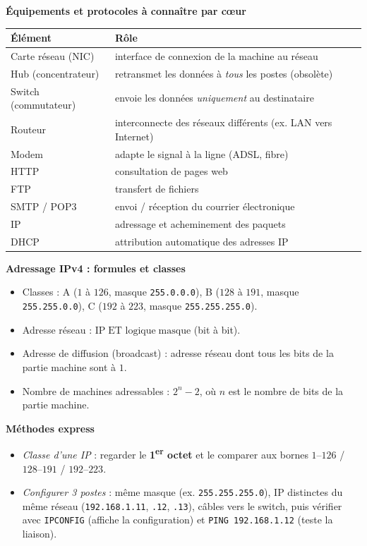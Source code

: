 \documentclass[11pt]{article}
\begin{document}
\begin{bilan}
\textbf{Équipements et protocoles à connaître par cœur}
\begin{center}
\begin{tabularx}{\linewidth}{|l|X|}
\hline
\rowcolor{popblueL} \textbf{Élément} & \textbf{Rôle} \\
\hline
Carte réseau (NIC) & interface de connexion de la machine au réseau \\
\hline
Hub (concentrateur) & retransmet les données à \emph{tous} les postes (obsolète) \\
\hline
Switch (commutateur) & envoie les données \emph{uniquement} au destinataire \\
\hline
Routeur & interconnecte des réseaux différents (ex. LAN vers Internet) \\
\hline
Modem & adapte le signal à la ligne (ADSL, fibre) \\
\hline
HTTP & consultation de pages web \\
\hline
FTP & transfert de fichiers \\
\hline
SMTP / POP3 & envoi / réception du courrier électronique \\
\hline
IP & adressage et acheminement des paquets \\
\hline
DHCP & attribution automatique des adresses IP \\
\hline
\end{tabularx}
\end{center}

\textbf{Adressage IPv4 : formules et classes}
\begin{itemize}
  \item Classes : A ($1$ à $126$, masque \texttt{255.0.0.0}), B ($128$ à $191$, masque \texttt{255.255.0.0}), C ($192$ à $223$, masque \texttt{255.255.255.0}).
  \item Adresse réseau : $\text{IP} \;\text{ET logique}\; \text{masque}$ (bit à bit).
  \item Adresse de diffusion (broadcast) : adresse réseau dont tous les bits de la partie machine sont à $1$.
  \item Nombre de machines adressables : $2^{n} - 2$, où $n$ est le nombre de bits de la partie machine.
\end{itemize}

\textbf{Méthodes express}
\begin{itemize}
  \item \emph{Classe d'une IP} : regarder le \textbf{1\textsuperscript{er} octet} et le comparer aux bornes $1$--$126$ / $128$--$191$ / $192$--$223$.
  \item \emph{Configurer 3 postes} : même masque (ex. \texttt{255.255.255.0}), IP distinctes du même réseau (\texttt{192.168.1.11}, \texttt{.12}, \texttt{.13}), câbles vers le switch, puis vérifier avec \texttt{IPCONFIG} (affiche la configuration) et \texttt{PING 192.168.1.12} (teste la liaison).
\end{itemize}
\end{bilan}
\end{document}
